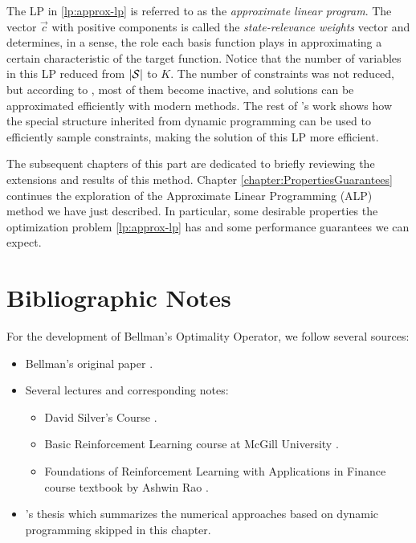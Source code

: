 The LP in \eqref{lp:approx-lp} is referred to as the \textit{approximate linear
program}. The vector $\vec{c}$ with positive components is called the
\emph{state-relevance weights} vector and determines, in a sense, the role each
basis function plays in approximating a certain characteristic of the target
function. Notice that the number of variables in this LP reduced from
$|\mathcal{S}|$ to $K$. The number of constraints was not reduced, but according to
\cite{farias2002thesis}, most of them become inactive, and solutions can be
approximated efficiently with modern methods. The rest of
\citeauthor{farias2002thesis}'s work shows how the special structure inherited
from dynamic programming can be used to efficiently sample constraints, making
the solution of this LP more efficient.

The subsequent chapters of this part are dedicated to briefly reviewing the
extensions and results of this method.  Chapter
\ref{chapter:PropertiesGuarantees} continues the exploration of the Approximate
Linear Programming (ALP) method we have just described. In particular, some
desirable properties the optimization problem \eqref{lp:approx-lp} has and some
performance guarantees we can expect.


\section{Bibliographic Notes}

For the development of Bellman's Optimality Operator, we follow several sources:
\begin{itemize}
    \item Bellman's original paper \cite{bellman1957}.
    \item Several lectures and corresponding notes:
    \begin{itemize}
        \item David Silver's Course \cite[Lects.~2-3]{silver2015}.
        \item Basic Reinforcement Learning course at McGill University
            \cite[Lect.~2]{moisescu-parejaa}.
        \item Foundations of Reinforcement Learning with Applications in Finance
            course textbook by Ashwin Rao \cite[Ch.1-4]{raoRL4F}.
    \end{itemize}
    \item \citeauthor{nadeemward2021}'s thesis \cite{nadeemward2021} which
        summarizes the numerical approaches based on dynamic programming skipped
        in this chapter.
    \end{itemize}

